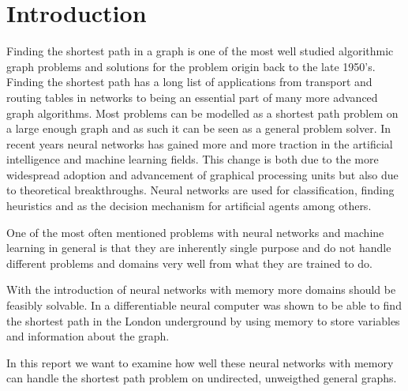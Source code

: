 
\section{Introduction}
Finding the shortest path in a graph is one of the most well studied algorithmic graph problems and solutions for the problem origin back to the late 1950's. Finding the shortest path has a long list of applications from transport and routing tables in networks to being an essential part of many more advanced graph algorithms. Most problems can be modelled as a shortest path problem on a large enough graph and as such it can be seen as a general problem solver. In recent years neural networks has gained more and more traction in the artificial intelligence and machine learning fields. This change is both due to the more widespread adoption and advancement of graphical processing units but also due to theoretical breakthroughs. Neural networks are used for classification, finding heuristics and as the decision mechanism for artificial agents among others.

\newpar One of the most often mentioned problems with neural networks and machine learning in general is that they are inherently single purpose and do not handle different problems and domains very well from what they are trained to do.

\newpar With the introduction of neural networks with memory more domains should be feasibly solvable. In \cite{graves2016hybrid} a differentiable neural computer was shown to be able to find the shortest path in the London underground by using memory to store variables and information about the graph.

\newpar In this report we want to examine how well these neural networks with memory can handle the shortest path problem on undirected, unweigthed general graphs.